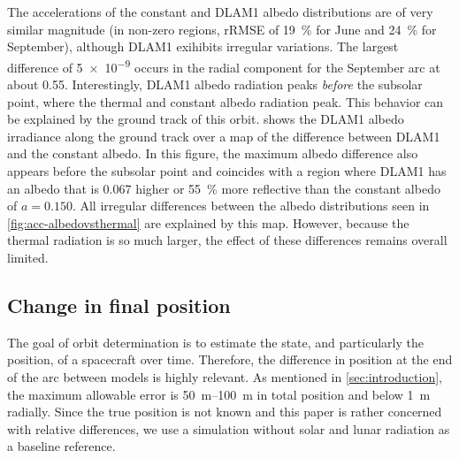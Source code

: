 The accelerations of the constant and \gls{DLAM1} albedo distributions are of very similar magnitude (in non-zero regions, rRMSE of \qty{19}{\percent} for June and \qty{24}{\percent} for September), although \gls{DLAM1} exihibits irregular variations. The largest difference of \qty{5e-9}{\acc} occurs in the radial component for the September arc at about 0.55. Interestingly, \gls{DLAM1} albedo radiation peaks \emph{before} the subsolar point, where the thermal and constant albedo radiation peak. This behavior can be explained by the ground track of this orbit.  shows the \gls{DLAM1} albedo irradiance along the ground track over a map of the difference between \gls{DLAM1} and the constant albedo. In this figure, the maximum albedo difference also appears before the subsolar point and coincides with a region where \gls{DLAM1} has an albedo that is \num{0.067} higher or \qty{55}{\percent} more reflective than the constant albedo of $a=0.150$. All irregular differences between the albedo distributions seen in \cref{fig:acc-albedovsthermal} are explained by this map. However, because the thermal radiation is so much larger, the effect of these differences remains overall limited.








\subsection{Change in final position}
The goal of orbit determination is to estimate the state, and particularly the position, of a spacecraft over time. Therefore, the difference in position at the end of the arc between models is highly relevant. As mentioned in \cref{sec:introduction}, the maximum allowable error is \qtyrange{50}{100}{\m} in total position and below \qty{1}{\m} radially. Since the true position is not known and this paper is rather concerned with relative differences, we use a simulation without solar and lunar radiation as a baseline reference.

\begin{table}[tb]
    \caption{Difference of final position in \unit{\m} with respect to the no-\gls{RP} baseline, given as mean over the final orbit plus/minus periodic variations around that mean. The largest changes are in the along-track position. $\mathbf{A}$: solar only; $\mathbf{B}$: lunar only (thermal + constant albedo); $\mathbf{C}$: lunar only (thermal + \gls{DLAM1} albedo); $\mathbf{D}$: solar + lunar (thermal + \gls{DLAM1} albedo).}
    \label{tab:final-position}
    \begin{subtable}[c]{\textwidth}
        
     \end{subtable}

     \medskip

     \begin{subtable}[c]{\textwidth}
        
     \end{subtable}
\end{table}

